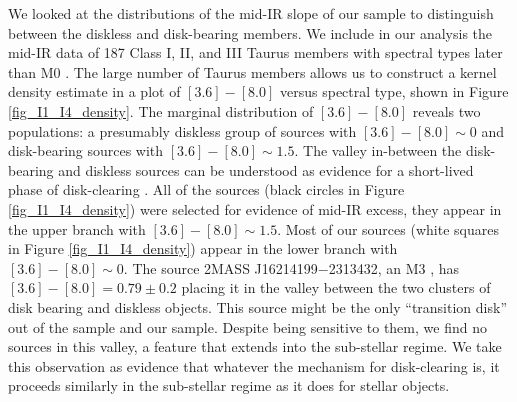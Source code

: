 We looked at the distributions of the mid-IR slope of our sample to distinguish between the diskless and disk-bearing members.  We include in our analysis the mid-IR data of 187 Class I, II, and III Taurus members with spectral types later than M0 \citep{2010ApJS..186..111L}.  The large number of Taurus members allows us to construct a kernel density estimate in a plot of $[3.6]-[8.0]$ versus spectral type, shown in Figure \ref{fig_I1_I4_density}.  The marginal distribution of $[3.6]-[8.0]$ reveals two populations: a presumably diskless group of sources with $[3.6]-[8.0] \sim 0$ and disk-bearing sources with $[3.6]-[8.0] \sim 1.5$.  The valley in-between the disk-bearing and diskless sources can be understood as evidence for a short-lived phase of disk-clearing \citep{2009ApJS..181..321E}.  All of the \citet{allers06} sources (black circles in Figure \ref{fig_I1_I4_density}) were selected for evidence of mid-IR excess, they appear in the upper branch with $[3.6]-[8.0] \sim 1.5$.  Most of our sources (white squares in Figure \ref{fig_I1_I4_density}) appear in the lower branch with $[3.6]-[8.0] \sim 0$.  The source 2MASS J16214199$-$2313432, an M3 \citep{2011ASPC..448..633G}, has $[3.6]-[8.0]=0.79\pm0.2$ placing it in the valley between the two clusters of disk bearing and diskless objects.  This source might be the only ``transition disk'' out of the \citet{allers06} sample and our sample.  Despite being sensitive to them, we find no sources in this valley, a feature that extends into the sub-stellar regime.  We take this observation as evidence that whatever the mechanism for disk-clearing is, it proceeds similarly in the sub-stellar regime as it does for stellar objects. 

